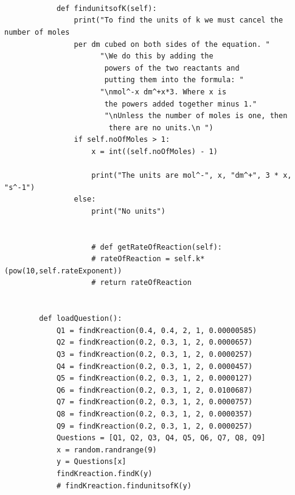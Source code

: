 \documentclass[a4paper,12pt]{report}
\begin{document}
\begin{lstlisting}[style = customc]
                            
        
        
            def findunitsofK(self):
                print("To find the units of k we must cancel the number of moles 
                per dm cubed on both sides of the equation. "
                      "\We do this by adding the
                       powers of the two reactants and
                       putting them into the formula: "
                      "\nmol^-x dm^+x*3. Where x is
                       the powers added together minus 1."
                       "\nUnless the number of moles is one, then
                        there are no units.\n ")
                if self.noOfMoles > 1:
                    x = int((self.noOfMoles) - 1)
        
                    print("The units are mol^-", x, "dm^+", 3 * x, "s^-1")
                else:
                    print("No units")
        
        
                    # def getRateOfReaction(self):
                    # rateOfReaction = self.k*(pow(10,self.rateExponent))
                    # return rateOfReaction
        
        
        def loadQuestion():
            Q1 = findKreaction(0.4, 0.4, 2, 1, 0.00000585)
            Q2 = findKreaction(0.2, 0.3, 1, 2, 0.0000657)
            Q3 = findKreaction(0.2, 0.3, 1, 2, 0.0000257)
            Q4 = findKreaction(0.2, 0.3, 1, 2, 0.0000457)
            Q5 = findKreaction(0.2, 0.3, 1, 2, 0.0000127)
            Q6 = findKreaction(0.2, 0.3, 1, 2, 0.0100687)
            Q7 = findKreaction(0.2, 0.3, 1, 2, 0.0000757)
            Q8 = findKreaction(0.2, 0.3, 1, 2, 0.0000357)
            Q9 = findKreaction(0.2, 0.3, 1, 2, 0.0000257)
            Questions = [Q1, Q2, Q3, Q4, Q5, Q6, Q7, Q8, Q9]
            x = random.randrange(9)
            y = Questions[x]
            findKreaction.findK(y)
            # findKreaction.findunitsofK(y)
        

\end{lstlisting}
\end{document}
